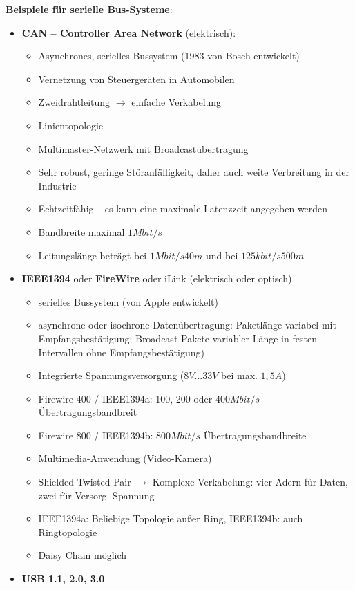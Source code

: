 \textbf{Beispiele für serielle Bus-Systeme}:
\begin{itemize}
\item \textbf{CAN – Controller Area Network} (elektrisch):
\begin{itemize}
\item Asynchrones, serielles Bussystem (1983 von Bosch entwickelt)
\item Vernetzung von Steuergeräten in Automobilen
\item Zweidrahtleitung $\rightarrow$ einfache Verkabelung
\item Linientopologie
\item Multimaster-Netzwerk mit Broadcastübertragung
\item Sehr robust, geringe Störanfälligkeit, daher auch weite Verbreitung in der Industrie
\item Echtzeitfähig -- es kann eine maximale Latenzzeit angegeben werden
\item Bandbreite maximal $1Mbit/s$
\item Leitungslänge beträgt bei $1Mbit/s 40m$ und bei $125kbit/s 500m$
\end{itemize}
\item \textbf{IEEE1394} oder \textbf{FireWire} oder iLink (elektrisch oder optisch)
\begin{itemize}
\item serielles Bussystem (von Apple entwickelt)
\item asynchrone oder isochrone Datenübertragung: Paketlänge variabel mit Empfangsbestätigung; Broadcast-Pakete variabler Länge in festen Intervallen ohne Empfangsbestätigung)
\item Integrierte Spannungsversorgung ($8V ... 33V$ bei max. $1,5A$)
\item Firewire 400 / IEEE1394a: 100, 200 oder 400$Mbit/s$ Übertragungsbandbreit
\item Firewire 800 / IEEE1394b: 800$Mbit/s$ Übertragungsbandbreite
\item Multimedia-Anwendung (Video-Kamera)
\item Shielded Twisted Pair $\rightarrow$ Komplexe Verkabelung: vier Adern für Daten, zwei für Versorg.-Spannung
\item IEEE1394a: Beliebige Topologie außer Ring, IEEE1394b: auch Ringtopologie
\item \glqq Daisy Chain\grqq{} möglich
\end{itemize}
\item \textbf{USB 1.1, 2.0, 3.0}
\begin{itemize}

\end{itemize}
\end{itemize}
